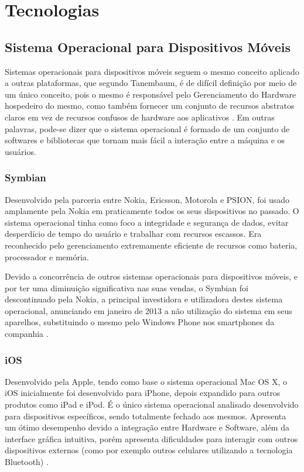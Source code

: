 
\chapter{Tecnologias}

\section{Sistema Operacional para Dispositivos Móveis}
Sistemas operacionais para dispositivos móveis seguem o mesmo conceito aplicado a outras plataformas, que segundo Tanembaum, é de difícil definição por meio de um único conceito, pois o mesmo é responsável pelo Gerenciamento do Hardware hospedeiro do mesmo, como também fornecer um conjunto de recursos abstratos claros em vez de recursos confusos de hardware aos aplicativos \cite{tanenbaum2010modern}. Em outras palavras, pode-se dizer que o sistema operacional é formado de um conjunto de softwares e bibliotecas que tornam mais fácil a interação entre a máquina e os usuários.

\subsection{Symbian}
Desenvolvido pela parceria entre Nokia, Ericsson, Motorola e PSION, foi usado amplamente pela Nokia em praticamente todos os seus dispositivos no passado. O sistema operacional tinha como foco a integridade e segurança de dados, evitar desperdício de tempo do usuário e trabalhar com recursos escassos. Era reconhecido pelo gerenciamento extremamente eficiente de recursos como bateria, processador e memória\cite{SistemasOperacionaisMoveisComputacao}.

Devido a concorrência de outros sistemas operacionais para dispositivos móveis, e por ter uma diminuição significativa nas suas vendas, o Symbian foi descontinuado pela Nokia, a principal investidora e utilizadora destes sistema operacional, anunciando em janeiro de 2013 a não utilização do sistema em seus aparelhos, substituindo o mesmo pelo Windows Phone nos smartphones da companhia \cite{NokiaSymbian}.

\subsection{iOS}
Desenvolvido pela Apple, tendo como base o sistema operacional Mac OS X, o iOS inicialmente foi desenvolvido para iPhone, depois expandido para outros produtos como iPad e iPod. É o único sistema operacional analisado desenvolvido para dispositivos específicos, sendo totalmente fechado aos mesmos. Apresenta um ótimo desempenho devido a integração entre Hardware e Software, além da interface gráfica intuitiva, porém apresenta dificuldades para interagir com outros dispositivos externos (como por exemplo outros celulares utilizando a tecnologia Bluetooth) \cite{AvaliacaoComparativaSOMoveis}.


